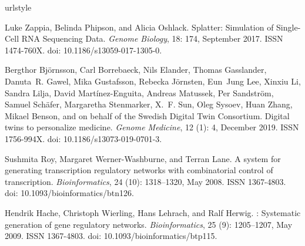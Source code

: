 \documentclass[10pt, a4paper]{article}
\begin{document}
\begin{thebibliography}{59}
	\providecommand{\natexlab}[1]{#1}
	\providecommand{\url}[1]{\texttt{#1}}
	\expandafter\ifx\csname urlstyle\endcsname\relax
	\providecommand{\doi}[1]{doi: #1}\else
	\providecommand{\doi}{doi: \begingroup \urlstyle{rm}\Url}\fi
	
	Luke Zappia, Belinda Phipson, and Alicia Oshlack.
	\newblock Splatter: {{Simulation}} of {{Single}}-{{Cell RNA Sequencing Data}}.
	\newblock \emph{Genome Biology}, 18: 174, September 2017.
	\newblock ISSN 1474-760X.
	\newblock \doi{10.1186/s13059-017-1305-0}.
	
	Bergthor Bj{\"o}rnsson, Carl Borrebaeck, Nils Elander, Thomas Gasslander,
	Danuta~R. Gawel, Mika Gustafsson, Rebecka J{\"o}rnsten, Eun~Jung Lee, Xinxiu
	Li, Sandra Lilja, David {Mart{\'i}nez-Enguita}, Andreas Matussek, Per
	Sandstr{\"o}m, Samuel Sch{\"a}fer, Margaretha Stenmarker, X.~F. Sun, Oleg
	Sysoev, Huan Zhang, Mikael Benson, and {on behalf of the Swedish Digital Twin
		Consortium}.
	\newblock Digital twins to personalize medicine.
	\newblock \emph{Genome Medicine}, 12 (1): 4, December 2019.
	\newblock ISSN 1756-994X.
	\newblock \doi{10.1186/s13073-019-0701-3}.
	
	Sushmita Roy, Margaret {Werner-Washburne}, and Terran Lane.
	\newblock A system for generating transcription regulatory networks with
	combinatorial control of transcription.
	\newblock \emph{Bioinformatics}, 24 (10): 1318--1320, May
	2008.
	\newblock ISSN 1367-4803.
	\newblock \doi{10.1093/bioinformatics/btn126}.
	
	Hendrik Hache, Christoph Wierling, Hans Lehrach, and Ralf Herwig.
	: Systematic generation of gene regulatory networks.
	\newblock \emph{Bioinformatics}, 25 (9): 1205--1207, May
	2009.
	\newblock ISSN 1367-4803.
	\newblock \doi{10.1093/bioinformatics/btp115}.
	

\end{thebibliography}
\end{document}
